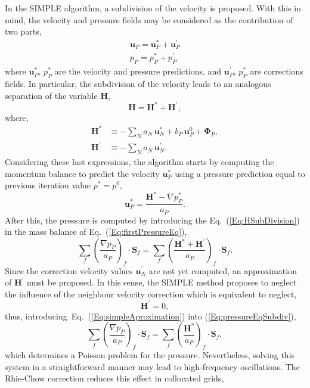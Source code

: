\documentclass[final,3p,times,11pt,onecolumn]{myElsarticle}
\numberwithin{equation}{section}
\begin{document}
In the SIMPLE algorithm, a subdivision of the velocity is proposed. With this in mind, the velocity and pressure fields may be considered as the contribution of two parts,
\begin{align}
\label{Eq:velocitySubdiv}
\boldsymbol{u}_P
= 
\boldsymbol{u}_P^{*} 
+
\boldsymbol{u}_P^{'}
\\
\label{Eq:pressureSubdiv}
p_P
=
p_P^{*} 
+
p_P^{'}
\end{align}
where $\boldsymbol{u}_P^{*}$, $p_P^{*}$ are the velocity and pressure predictions, and $\boldsymbol{u}_P^{'}$, $p_P^{*}$ are corrections fields. In particular, the subdivision of the velocity leads to an analogous separation of the variable $\boldsymbol{H}$,
\begin{equation}
\label{Eq:HSubDivision}
\boldsymbol{H} 
=
\boldsymbol{H}^{*}
+
\boldsymbol{H}^{'},
\end{equation}
where,
\begin{align}
\label{Eq:HStar}
\boldsymbol{H}^{*} 
&\equiv -\sum_{N} a_{N}\,\boldsymbol{u}_{N}^{*}
+
b_P\, \boldsymbol{u}^0_P 
+ 
\boldsymbol{\Phi}_P,
\\
\label{Eq:HPrima}
\boldsymbol{H}^{'}
&\equiv -\sum_{N} a_{N}\,\boldsymbol{u}_{N}^{'}. 
\end{align}
Considering these last expressions, the algorithm starts by computing the momentum balance to predict the velocity $\boldsymbol{u}_P^{*}$ using a pressure prediction equal to previous iteration value $p^{*}=p^{0}$,
\begin{equation}
\label{Eq:MomentumPredictor}
\boldsymbol{u}_P^{*}
=
\dfrac
{
\boldsymbol{H}^*
- 
\nabla p_P^{*}}
{a_P}.
\end{equation}
After this, the pressure is computed by introducing the Eq.~(\ref{Eq:HSubDivision}) in the mass balance of Eq.~(\ref{Eq:firstPressureEq}),
\begin{equation}
\label{Eq:pressureEqSubdiv}
\sum_{f} 
\left(
\dfrac
{
\nabla p_P}
{a_P}
\right)_f
\cdotp 
\textbf{S}_{f}
=
\sum_{f} 
\left(
\dfrac
{
\boldsymbol{H}^{*}
+
\boldsymbol{H}^{'}
}
{a_P}
\right)_f
\cdotp 
\textbf{S}_{f}.
\end{equation}
Since the correction velocity values $\boldsymbol{u}_N^{'}$  are not yet computed, an approximation of $\boldsymbol{H}^{'}$ must be proposed. In this sense, the SIMPLE method proposes to neglect the influence of the neighbour velocity correction which is equivalent to neglect,
\begin{equation}
\label{Eq:simpleAproximation}
\boldsymbol{H}^{'} = 0,
\end{equation}
thus, introducing~Eq.~(\ref{Eq:simpleAproximation}) into (\ref{Eq:pressureEqSubdiv}),
\begin{equation}
\sum_{f} 
\left(
\dfrac
{
\nabla p_P}
{a_P}
\right)_f
\cdotp 
\textbf{S}_{f}
=
\sum_f 
\left(
\dfrac
{
\boldsymbol{H}^*
}
{
a_P
}
\right)_f
\cdot
\boldsymbol{S}_f,
\label{eq:div-free5}  
\end{equation}
which determines a Poisson problem for the pressure. Nevertheless, solving this system in a straightforward manner may lead to high-frequency oscillations. The Rhie-Chow correction \cite{rhiechow} reduces this effect in collocated grids, 
\end{document}
